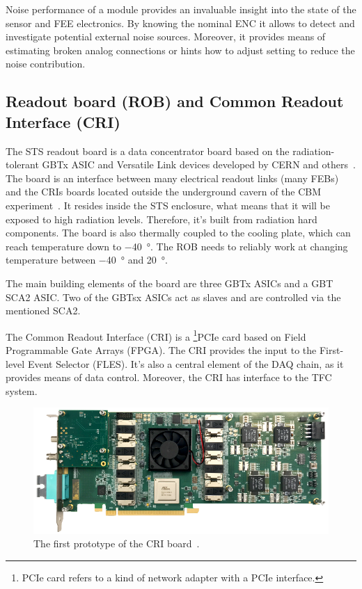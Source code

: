 Noise performance of a module provides an invaluable insight into the state of the sensor and \gls{FEE} electronics. By knowing the nominal \gls{ENC} it allows to detect and investigate potential external noise sources. Moreover, it provides means of estimating broken analog connections or hints how to adjust setting to reduce the noise contribution.
\subsection{Readout board (ROB) and Common Readout Interface (CRI)}

The \gls{STS} readout board is a data concentrator board based on the radiation-tolerant GBTx ASIC and Versatile Link
devices developed by CERN and others~\cite{Bonacini:1235849, C_2013}. The board is an interface between many electrical readout links (many \glspl{FEB}) and the \glspl{CRI} boards located outside the underground cavern of the \gls{CBM} experiment~\cite{Lehnert_2017}. It resides inside the \gls{STS} enclosure, what means that it will be exposed to high radiation levels. Therefore, it's built from radiation hard components. The board is also thermally coupled to the cooling plate, which can reach temperature down to \SI{-40}{\degree}. The \gls{ROB} needs to reliably work at changing temperature between \SI{-40}{\degree} and \SI{20}{\degree}. 

The main building elements of the board are three \gls{GBT}x \glspl{ASIC} and a \gls{GBT} \gls{SCA2} \gls{ASIC}. Two of the \glspl{GBT}x \glspl{ASIC} act as slaves and are controlled via the mentioned \gls{SCA2}. 

The Common Readout Interface (\gls{CRI}) is a \footnote{PCIe card refers to a kind of network adapter with a PCIe interface.}{PCIe card} based on Field Programmable Gate Arrays (\gls{FPGA}). The \gls{CRI} provides the input to the First-level Event Selector (\gls{FLES}). It's also a central element of the \gls{DAQ} chain, as it provides means of data control. Moreover, the \gls{CRI} has interface to the \gls{TFC} system. 
\begin{figure}[!h]
\centering
\includegraphics[width=0.8\columnwidth]{Chapter2/images/cri_board_atlas.pdf}
\caption{The first prototype of the \gls{CRI} board~\cite{CRI}.}
\label{fig_cri_board}
\end{figure}


